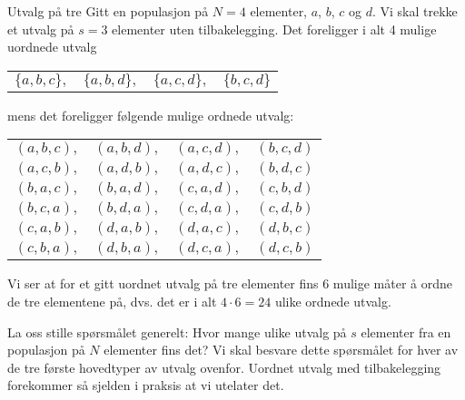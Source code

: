 \begin{eksempel}{Utvalg på tre}
Gitt en populasjon på $N = 4$ elementer, $a$, $b$, $c$ og $d$. Vi skal
trekke et utvalg på $s=3$ elementer uten tilbakelegging. Det
foreligger i alt 4 mulige uordnede utvalg
\begin{center}
\begin{tabular}{cccc}
         $\{a,b,c\},$&$\{a,b,d\},$&$\{a,c,d\},$&$\{b,c,d\}$ \\
\end{tabular}
\end{center}
mens det foreligger følgende mulige ordnede utvalg:
\begin{center}
\begin{tabular}{cccc}
            $(a,b,c),$&$(a,b,d),$&$(a,c,d),$&$(b,c,d)$ \\
            $(a,c,b),$&$(a,d,b),$&$(a,d,c),$&$(b,d,c)$ \\
            $(b,a,c),$&$(b,a,d),$&$(c,a,d),$&$(c,b,d)$ \\
            $(b,c,a),$&$(b,d,a),$&$(c,d,a),$&$(c,d,b)$ \\
            $(c,a,b),$&$(d,a,b),$&$(d,a,c),$&$(d,b,c)$ \\
            $(c,b,a),$&$(d,b,a),$&$(d,c,a),$&$(d,c,b)$ \\
\end{tabular}
\end{center}
Vi ser at for et gitt uordnet utvalg på tre elementer fins 6
mulige måter å ordne de tre elementene på, dvs. det er i alt
$4\cdot 6=24$ ulike ordnede utvalg.
\end{eksempel}

La oss stille spørsmålet generelt: Hvor mange ulike utvalg på $s$
elementer fra en populasjon på $N$ elementer fins det? Vi skal
besvare dette spørsmålet for hver av de tre første hovedtyper av
utvalg ovenfor. Uordnet utvalg med tilbakelegging forekommer så sjelden
i praksis at vi utelater det.


